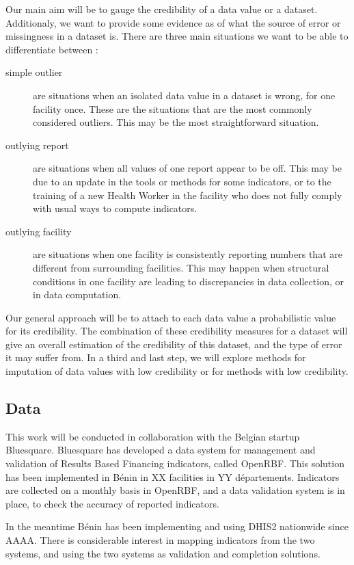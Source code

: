 Our main aim will be to gauge the credibility of a data value or a dataset.  Additionaly, we want to provide some evidence as of what the source of error or missingness in a dataset is. There are three main situations we want to be able to differentiate between :
\begin{description}
\item[simple outlier] are situations when an isolated data value in a dataset is wrong, for one facility once. These are the situations that are the most commonly considered outliers. This may be the most straightforward situation.
\item[outlying report] are situations when all values of one report appear to be off. This may be due to an update in the tools or methods for some indicators, or to the training of a new Health Worker in the facility who does not fully comply with usual ways to compute indicators.
\item[outlying facility] are situations when one facility is consistently reporting numbers that are different from surrounding facilities. This may happen when structural conditions in one facility are leading to discrepancies in data collection, or in data computation.
\end{description}

Our general approach will be to attach to each data value a probabilistic value for its credibility. The combination of these credibility measures for a dataset will give an overall estimation of the credibility of this dataset, and the type of error it may suffer from. In a third and last step, we will explore methods for imputation of data values with low credibility or for methods with low credibility.


\subsection{Data}

This work will be conducted in collaboration with the Belgian startup Bluesquare. Bluesquare has developed a data system for management and validation of Results Based Financing indicators, called OpenRBF. This solution has been implemented in Bénin in XX facilities in YY départements. Indicators are collected on a monthly basis in OpenRBF, and a data validation system is in place, to check the accuracy of reported indicators.

In the meantime Bénin has been implementing and using DHIS2 nationwide since AAAA. There is considerable interest in mapping indicators from the two systems, and using the two systems as validation and completion solutions.

